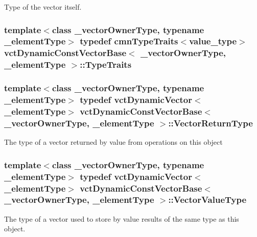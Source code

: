 Type of the vector itself. \hypertarget{classvct_dynamic_const_vector_base_a83723d7033db878894d4ab6c39bda2a4}{
\subsubsection[{Type\-Traits}]{\setlength{\rightskip}{0pt plus 5cm}template$<$class \-\_\-vector\-Owner\-Type, typename \-\_\-element\-Type$>$ typedef {\bf cmn\-Type\-Traits}$<$value\-\_\-type$>$ {\bf vct\-Dynamic\-Const\-Vector\-Base}$<$ \-\_\-vector\-Owner\-Type, \-\_\-element\-Type $>$\-::{\bf Type\-Traits}}}\label{classvct_dynamic_const_vector_base_a83723d7033db878894d4ab6c39bda2a4}
\hypertarget{classvct_dynamic_const_vector_base_a379e4153bb82059072257410945bf83c}{
\subsubsection[{Vector\-Return\-Type}]{\setlength{\rightskip}{0pt plus 5cm}template$<$class \-\_\-vector\-Owner\-Type, typename \-\_\-element\-Type$>$ typedef {\bf vct\-Dynamic\-Vector}$<$\-\_\-element\-Type$>$ {\bf vct\-Dynamic\-Const\-Vector\-Base}$<$ \-\_\-vector\-Owner\-Type, \-\_\-element\-Type $>$\-::{\bf Vector\-Return\-Type}}}\label{classvct_dynamic_const_vector_base_a379e4153bb82059072257410945bf83c}
The type of a vector returned by value from operations on this object \hypertarget{classvct_dynamic_const_vector_base_a8ffd0619835fb50d43c07502d231e6c8}{
\subsubsection[{Vector\-Value\-Type}]{\setlength{\rightskip}{0pt plus 5cm}template$<$class \-\_\-vector\-Owner\-Type, typename \-\_\-element\-Type$>$ typedef {\bf vct\-Dynamic\-Vector}$<$\-\_\-element\-Type$>$ {\bf vct\-Dynamic\-Const\-Vector\-Base}$<$ \-\_\-vector\-Owner\-Type, \-\_\-element\-Type $>$\-::{\bf Vector\-Value\-Type}}}\label{classvct_dynamic_const_vector_base_a8ffd0619835fb50d43c07502d231e6c8}
The type of a vector used to store by value results of the same type as this object. 

